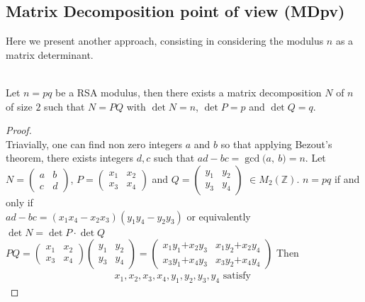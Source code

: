 \documentclass[sigconf,balance=false]{acmart}
\begin{document}
\subsection{Matrix Decomposition point of view (MDpv)}
Here we present another approach, consisting in considering the modulus $n$ as a matrix determinant.
\begin{theorem} \ \\ \rm{
Let $n=pq$ be a RSA modulus, then there exists a matrix decomposition  $N$ of $n$ of size $2$ such that $N=PQ$ with $\det N=n$, $\det P=p$ and $\det Q=q$.
}
\end{theorem}
\begin{proof} \ \\ 
Triavially, one can find non zero integers $a$ and $b$ so that applying Bezout's theorem, there exists integers $d, c$ such that $ad-bc=\gcd\text{(}a, \ b\text{)}=n$.
Let $N=
\begin{pmatrix}
a & b \\ 
c & d
\end{pmatrix}$, $P=
\begin{pmatrix}
x_{1} & x_{2} \\ 
x_{3} & x_{4}
\end{pmatrix} $ and $Q=
\begin{pmatrix}
y_{1} & y_{2} \\ 
y_{3} & y_{4}
\end{pmatrix}$ $\in \displaystyle  M_{2}\left(\mathbb{Z}\right)$.
$n=pq$ if and only if \\ $\displaystyle ad-bc=\left(x_{1}x_{4}-x_{2}x_{3}\right) \left(y_{1}y_{4}-y_{2}y_{3}\right)$ or equivalently \\ $\displaystyle\det N=\det P \cdot \det Q$\\
$PQ=\begin{pmatrix}
x_{1} & x_{2} \\ 
x_{3} & x_{4}
\end{pmatrix} 
\begin{pmatrix}
y_{1} & y_{2} \\ 
y_{3} & y_{4}
\end{pmatrix}=
\begin{pmatrix}
x_{1}y_{1} \text{+} x_{2}y_{3} & x_{1}y_{2} \text{+} x_{2}y_{4} \\ 
x_{3}y_{1} \text{+} x_{4}y_{3} & x_{3}y_{2} \text{+} x_{4}y_{4}
\end{pmatrix}$
Then
\begin{eqnarray}\label{s1}
	x_{1}, x_{2}, x_{3}, x_{4}, y_{1}, y_{2}, y_{3}, y_{4} \text{ satisfy }

\end{eqnarray}
\end{proof}
\end{document}
